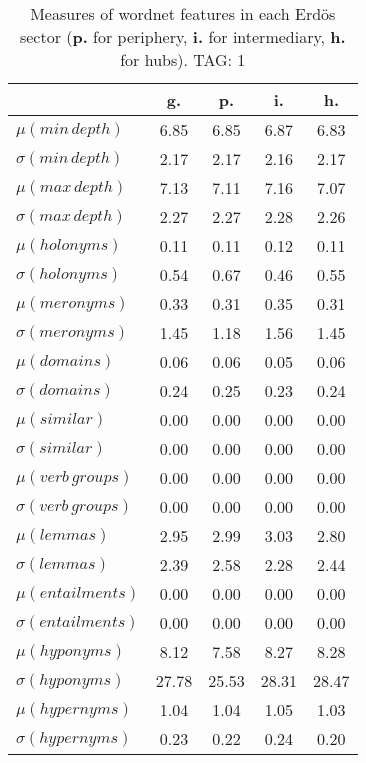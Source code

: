 \begin{table}[h!]
\begin{center}
\begin{tabular}{| l || c | c | c | c |}\hline
 & {\bf g.} & {\bf p.} & {\bf i.} & {\bf h.} \\\hline\hline
$\mu(min\,depth)$ & 6.85  & 6.85  & 6.87  & 6.83 \\
$\sigma(min\,depth)$ & 2.17  & 2.17  & 2.16  & 2.17 \\\hline
$\mu(max\,depth)$ & 7.13  & 7.11  & 7.16  & 7.07 \\
$\sigma(max\,depth)$ & 2.27  & 2.27  & 2.28  & 2.26 \\\hline
$\mu(holonyms)$ & 0.11  & 0.11  & 0.12  & 0.11 \\
$\sigma(holonyms)$ & 0.54  & 0.67  & 0.46  & 0.55 \\\hline
$\mu(meronyms)$ & 0.33  & 0.31  & 0.35  & 0.31 \\
$\sigma(meronyms)$ & 1.45  & 1.18  & 1.56  & 1.45 \\\hline
$\mu(domains)$ & 0.06  & 0.06  & 0.05  & 0.06 \\
$\sigma(domains)$ & 0.24  & 0.25  & 0.23  & 0.24 \\\hline
$\mu(similar)$ & 0.00  & 0.00  & 0.00  & 0.00 \\
$\sigma(similar)$ & 0.00  & 0.00  & 0.00  & 0.00 \\\hline
$\mu(verb\,groups)$ & 0.00  & 0.00  & 0.00  & 0.00 \\
$\sigma(verb\,groups)$ & 0.00  & 0.00  & 0.00  & 0.00 \\\hline
$\mu(lemmas)$ & 2.95  & 2.99  & 3.03  & 2.80 \\
$\sigma(lemmas)$ & 2.39  & 2.58  & 2.28  & 2.44 \\\hline
$\mu(entailments)$ & 0.00  & 0.00  & 0.00  & 0.00 \\
$\sigma(entailments)$ & 0.00  & 0.00  & 0.00  & 0.00 \\\hline
$\mu(hyponyms)$ & 8.12  & 7.58  & 8.27  & 8.28 \\
$\sigma(hyponyms)$ & 27.78  & 25.53  & 28.31  & 28.47 \\\hline
$\mu(hypernyms)$ & 1.04  & 1.04  & 1.05  & 1.03 \\
$\sigma(hypernyms)$ & 0.23  & 0.22  & 0.24  & 0.20 \\\hline
\end{tabular}
\caption{Measures of wordnet features in each Erd\"os sector ({{\bf p.}} for periphery, {{\bf i.}} for intermediary, {{\bf h.}} for hubs). TAG: 1}
\end{center}
\end{table}